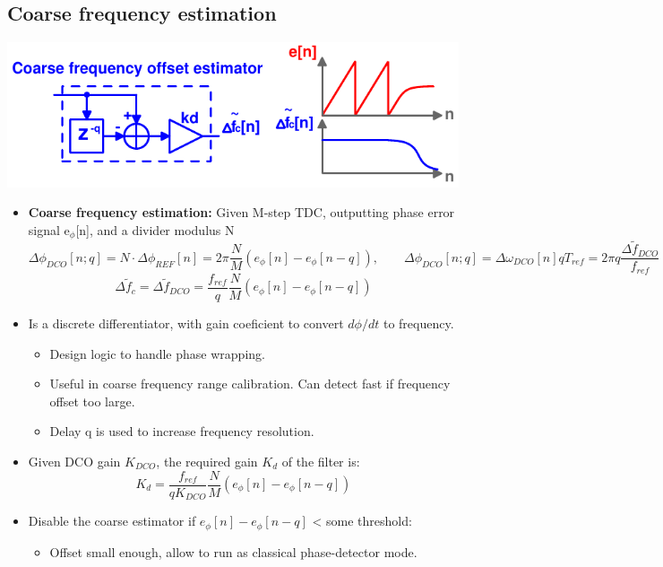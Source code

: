 \documentclass[10pt,a4paper]{article}
\begin{document}
		\subsection{Coarse frequency estimation}
		\vspace{-0.5em}
		\center\includegraphics[width=0.5\linewidth, angle=0]{figs/coarse_est.pdf}
		\begin{itemize}
			\footnotesize
			\item \textbf{Coarse frequency estimation:} Given M-step TDC, outputting phase error signal e$_\phi$[n], and a divider modulus N
			\tiny
			\vspace{-1em}
			\begin{equation}
				\Delta \phi_{DCO}[n; q] = N\cdot\Delta \phi_{REF}[n] = 2\pi \frac{N}{M}\left( e_\phi[n]-e_\phi[n-q]\right ),\hspace{2em} \Delta \phi_{DCO}[n; q] = \Delta \omega_{DCO}[n]qT_{ref} = 2\pi q \frac{\Delta \tilde f_{DCO}}{f_{ref}}
			\end{equation}
			\vspace{-1em}
			\begin{equation}
				\Delta \tilde f_{c} =\Delta \tilde f_{DCO} = \frac{f_{ref}}{q}\frac{N}{M}\left( e_\phi[n]-e_\phi[n-q]\right )
			\end{equation}				
			\footnotesize	
			\item Is a discrete differentiator, with gain coeficient to convert $d\phi/dt$ to frequency. 
			\begin{itemize}
				\scriptsize
				\item Design logic to handle phase wrapping.	
				\item Useful in coarse frequency range calibration. Can detect fast if frequency offset too large.
				\item Delay q is used to increase frequency resolution. 
			\end{itemize}			
		\end{itemize} 
		\begin{itemize}
			\footnotesize
			\item Given DCO gain $K_{DCO}$, the required gain $K_d$ of the filter is:
			\tiny
			\vspace{-0.5em}
			\begin{equation}
				K_{d} = \frac{f_{ref}}{qK_{DCO}}\frac{N}{M}\left( e_\phi[n]-e_\phi[n-q]\right )
			\end{equation}				
			\footnotesize	
			\item Disable the coarse estimator if $e_\phi[n]-e_\phi[n-q]$ < some threshold:
			\begin{itemize}
				\scriptsize
				\item Offset small enough, allow to run as classical phase-detector mode.
			\end{itemize}	
		\end{itemize} 
\end{document}
